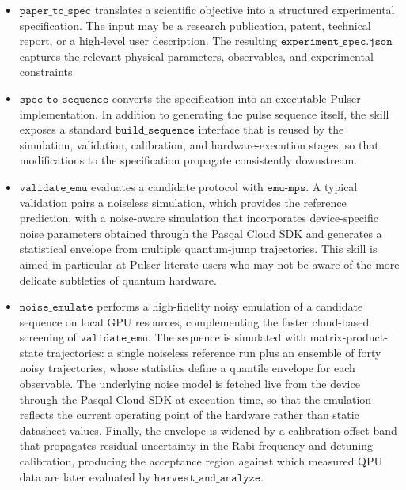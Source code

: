 \documentclass[aps,pra,reprint,amssymb,superscriptaddress,nofootinbib,floatfix]{revtex4-2}
\begin{document}
\begin{itemize}
    \item $\texttt{paper_to_spec}$ translates a scientific objective into a structured experimental specification. The input may be a research publication, patent, technical report, or a high-level user description. The resulting $\texttt{experiment_spec.json}$ captures the relevant physical parameters, observables, and experimental constraints. \\ 
    \item $\texttt{spec_to_sequence}$ converts the specification into an executable Pulser implementation. In addition to generating the pulse sequence itself, the skill exposes a standard $\texttt{build_sequence}$ interface that is reused by the simulation, validation, calibration, and hardware-execution stages, so that modifications to the specification propagate consistently downstream. \\
    \item $\texttt{validate_emu}$ evaluates a candidate protocol with $\texttt{emu-mps}$. A typical validation pairs a noiseless simulation, which provides the reference prediction, with a noise-aware simulation that incorporates device-specific noise parameters obtained through the Pasqal Cloud SDK and generates a statistical envelope from multiple quantum-jump trajectories. This skill is aimed in particular at Pulser-literate users who may not be aware of the more delicate subtleties of quantum hardware. \\
    \item $\texttt{noise_emulate}$ performs a high-fidelity noisy emulation of a candidate sequence on local GPU resources, complementing the faster cloud-based screening of $\texttt{validate_emu}$. The sequence is simulated with matrix-product-state trajectories: a single noiseless reference run plus an ensemble of forty noisy trajectories, whose statistics define a quantile envelope for each observable. The underlying noise model is fetched live from the device through the Pasqal Cloud SDK at execution time, so that the emulation reflects the current operating point of the hardware rather than static datasheet values. Finally, the envelope is widened by a calibration-offset band that propagates residual uncertainty in the Rabi frequency and detuning calibration, producing the acceptance region against which measured QPU data are later evaluated by $\texttt{harvest_and_analyze}$. \\


\end{itemize}
\end{document}
